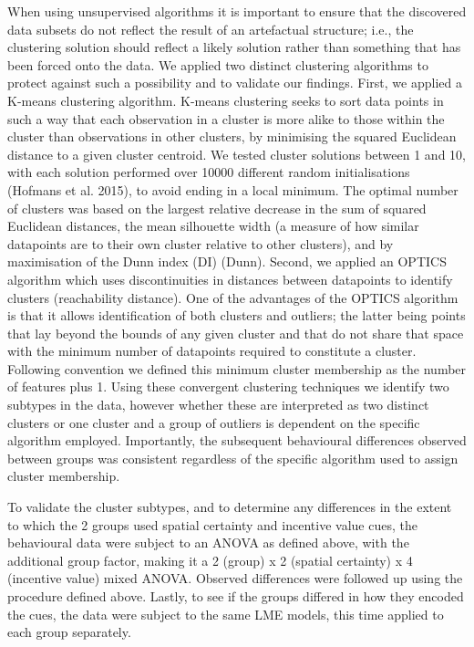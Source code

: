 \documentclass[11pt,halfline,a4paper,]{ouparticle}
\begin{document}
When using unsupervised algorithms it is important to ensure that the discovered data subsets do not reflect the result of an artefactual structure; i.e., the clustering solution should reflect a likely solution rather than something that has been forced onto the data. We applied two distinct clustering algorithms to protect against such a possibility and to validate our findings. First, we applied a K-means clustering algorithm. K-means clustering seeks to sort data points in such a way that each observation in a cluster is more alike to those within the cluster than observations in other clusters, by minimising the squared Euclidean distance to a given cluster centroid. We tested cluster solutions between 1 and 10, with each solution performed over 10000 different random initialisations (Hofmans et al. 2015), to avoid ending in a local minimum. The optimal number of clusters was based on the largest relative decrease in the sum of squared Euclidean distances, the mean silhouette width (a measure of how similar datapoints are to their own cluster relative to other clusters), and by maximisation of the Dunn index (DI) (Dunn). Second, we applied an OPTICS algorithm which uses discontinuities in distances between datapoints to identify clusters (reachability distance). One of the advantages of the OPTICS algorithm is that it allows identification of both clusters and outliers; the latter being points that lay beyond the bounds of any given cluster and that do not share that space with the minimum number of datapoints required to constitute a cluster. Following convention we defined this minimum cluster membership as the number of features plus 1. Using these convergent clustering techniques we identify two subtypes in the data, however whether these are interpreted as two distinct clusters or one cluster and a group of outliers is dependent on the specific algorithm employed. Importantly, the subsequent behavioural differences observed between groups was consistent regardless of the specific algorithm used to assign cluster membership.

To validate the cluster subtypes, and to determine any differences in the extent to which the 2 groups used spatial certainty and incentive value cues, the behavioural data were subject to an ANOVA as defined above, with the additional group factor, making it a 2 (group) x 2 (spatial certainty) x 4 (incentive value) mixed ANOVA. Observed differences were followed up using the procedure defined above. Lastly, to see if the groups differed in how they encoded the cues, the data were subject to the same LME models, this time applied to each group separately.
\end{document}
